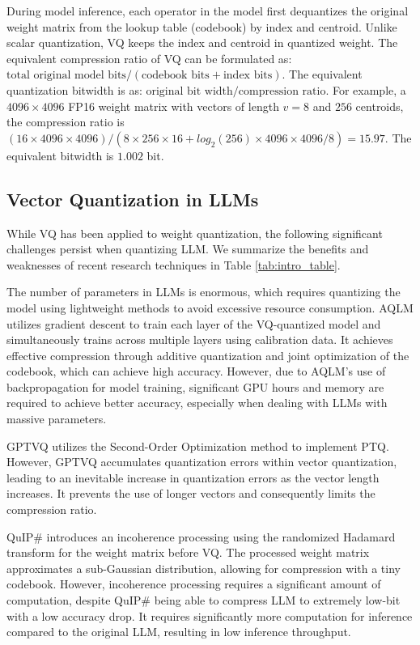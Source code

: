 During model inference, each operator in the model first dequantizes the original weight matrix from the lookup table (codebook) by index and centroid. 
Unlike scalar quantization, VQ keeps the index and centroid in quantized weight. 
The equivalent compression ratio of VQ can be formulated as: $\text{total original model bits} / (\text{codebook bits} + \text{index bits})$. 
The equivalent quantization bitwidth is as: $\text{original bit width}/\text{compression ratio}$.
For example, a $4096 \times 4096$ FP16 weight matrix with vectors of length $v=8$ and $256$ centroids, the compression ratio is $(16 \times 4096 \times 4096) / (8 \times 256 \times 16 + log_{2}(256) \times 4096 \times 4096 / 8) = 15.97$. 
The equivalent bitwidth is $1.002$ bit. 



\subsection{Vector Quantization in LLMs}
While VQ has been applied to weight quantization, the following significant challenges persist when quantizing LLM. 
We summarize the benefits and weaknesses of recent research \citep{AQLM, QuIPsharp, GPTVQ} techniques in Table \ref{tab:intro_table}.

The number of parameters in LLMs is enormous, which requires quantizing the model using lightweight methods to avoid excessive resource consumption.
AQLM \citep{AQLM} utilizes gradient descent to train each layer of the VQ-quantized model and simultaneously trains across multiple layers using calibration data.
It achieves effective compression through additive quantization and joint optimization of the codebook, which can achieve high accuracy. However, due to AQLM's use of backpropagation for model training, significant GPU hours and memory are required to achieve better accuracy, especially when dealing with LLMs with massive parameters.

GPTVQ \citep{GPTVQ} utilizes the Second-Order Optimization method to implement PTQ. 
However, GPTVQ accumulates quantization errors within vector quantization, leading to an inevitable increase in quantization errors as the vector length increases. 
It prevents the use of longer vectors and consequently limits the compression ratio.

QuIP\# \citep{QuIPsharp} introduces an incoherence processing using the randomized Hadamard transform for the weight matrix before VQ. 
The processed weight matrix approximates a sub-Gaussian distribution, allowing for compression with a tiny codebook.
However, incoherence processing requires a significant amount of computation, despite QuIP\# being able to compress LLM to extremely low-bit with a low accuracy drop.
It requires significantly more computation for inference compared to the original LLM, resulting in low inference throughput.











